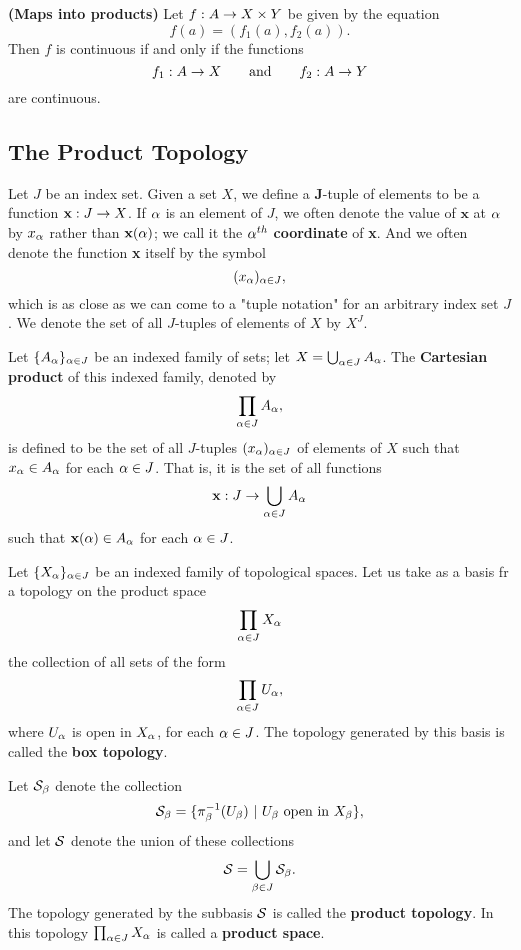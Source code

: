 \vs 

\begin{thm}\textbf{(Maps into products)} Let $f:A\rightarrow X\times Y$ be given by the equation
\[f(a) = (f_1(a), f_2(a)).\]
Then $f$ is continuous if and only if the functions 
\[f_1:A\rightarrow X\qquad\text{and}\qquad f_2:A\rightarrow Y\]
are continuous.
\end{thm}

\subsection{The Product Topology}\nl
\setcounter{section}{19}
\setcounter{thm}{0}

\vs

\dfn Let $J$ be an index set. Given a set $X$, we define a $\boldsymbol J$-tuple of elements to be a function $\textbf{x}:J \rightarrow X$. If $\alpha$ is an element of $J$, we often denote the value of $\textbf{x}$ at $\alpha$ by $x_\alpha$ rather than $\textbf{x}(\alpha)$; we call it the $\alpha^{th}$ \textbf{coordinate} of \textbf{x}. And we often denote the function \textbf{x} itself by the symbol 
\[(x_\alpha)_{\alpha\in J},\]
which is as close as we can come to a "tuple notation" for an arbitrary index set $J$. We denote the set of all $J$-tuples of elements of $X$ by $X^J$.

\dfn Let $\{A_\alpha\}_{\alpha\in J}$ be an indexed family of sets; let $X = \bigcup_{\alpha\in J} A_\alpha$. The \textbf{Cartesian product} of this indexed family, denoted by
\[\prod_{\alpha\in J}A_\alpha,\]
is defined to be the set of all $J$-tuples $(x_\alpha)_{\alpha\in J}$ of elements of $X$ such that $x_\alpha \in A_\alpha$ for each $\alpha \in J$. That is, it is the set of all functions 
\[\textbf{x}:J\rightarrow \bigcup_{\alpha\in J} A_\alpha\]
such that $\textbf{x}(\alpha)\in A_\alpha$ for each $\alpha\in J$.

\dfn Let $\{X_\alpha\}_{\alpha \in J}$ be an indexed family of topological spaces. Let us take as a basis fr a topology on the product space
\[\prod_{\alpha\in J}X_\alpha\]
the collection of all sets of the form
\[\prod_{\alpha\in J}U_\alpha,\]
where $U_\alpha$ is open in $X_\alpha$, for each $\alpha \in J$. The topology generated by this basis is called the \textbf{box topology}.

\dfn Let $\mathcal{S}_\beta$ denote the collection
\[\mathcal{S}_\beta = \{\pi_\beta^{-1}(U_\beta)\ |\ U_\beta \text{ open in } X_\beta\},\]
and let $\mathcal{S}$ denote the union of these collections 
\[\mathcal{S} = \bigcup_{\beta\in J}\mathcal{S}_\beta.\]
The topology generated by the subbasis $\mathcal{S}$ is called the \textbf{product topology}. In this topology $\prod_{\alpha\in J}X_\alpha$ is called a \textbf{product space}.

